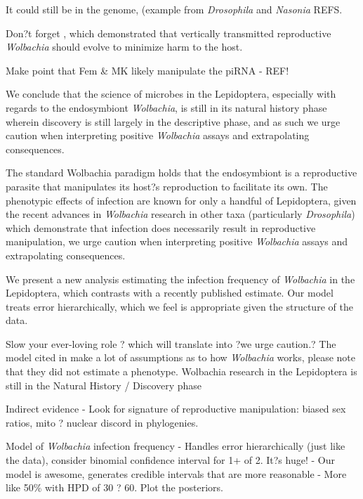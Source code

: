 \documentclass{frontiersSCNS}
\begin{document}
It could still be in the genome, (example from \textit{Drosophila} and \textit{Nasonia} REFS.

Don?t forget \citet{Prout:1994th}, which demonstrated that vertically transmitted reproductive \textit{Wolbachia} should evolve to minimize harm to the host. 



\citet{vanNieukerken:2011a123}

\citet{Jiggins:2001p7754}

\citet{Jiggins:2001uo}


Make point that Fem \& MK likely manipulate the piRNA - REF!

We conclude that the science of microbes in the Lepidoptera, especially with regards to the endosymbiont \textit{Wolbachia}, is still in its natural history phase wherein discovery is still largely in the descriptive phase, and as such we urge caution when interpreting positive \textit{Wolbachia} assays and extrapolating consequences. 

The standard Wolbachia paradigm holds that the endosymbiont is a reproductive parasite that manipulates its host?s reproduction to facilitate its own. The phenotypic effects of infection are known for only a handful of Lepidoptera, given the recent advances in \textit{Wolbachia} research in other taxa (particularly \textit{Drosophila}) which demonstrate that infection does necessarily result in reproductive manipulation, we urge caution when interpreting positive \textit{Wolbachia} assays and extrapolating consequences.

We present a new analysis estimating the infection frequency of \textit{Wolbachia} in the Lepidoptera, which contrasts with a recently published estimate. Our model treats error hierarchically, which we feel is appropriate given the structure of the data. 

Slow your ever-loving role ? which will translate into ?we urge caution.?
The model cited in \citet{Nice:2009p7399} make a lot of assumptions as to how \textit{Wolbachia} works, please note that they did not estimate a phenotype.
Wolbachia research in the Lepidoptera is still in the Natural History / Discovery phase

Indirect evidence - Look for signature of reproductive manipulation: biased sex ratios, mito ? nuclear discord in phylogenies. 


Model of \textit{Wolbachia} infection frequency - Handles error hierarchically (just like the data), consider binomial confidence interval for 1+ of 2. It?s huge! - Our model is awesome, generates credible intervals that are more reasonable - More like 50\% with HPD of 30 ? 60. Plot the posteriors. 
\end{document}

